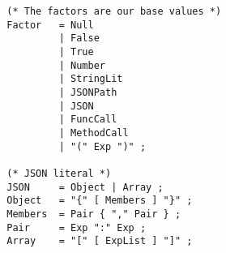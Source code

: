 \begin{center}
\begin{verbatim}
        (* The factors are our base values *)
        Factor   = Null
                 | False
                 | True
                 | Number
                 | StringLit
                 | JSONPath
                 | JSON
                 | FuncCall
                 | MethodCall
                 | "(" Exp ")" ;

        (* JSON literal *)
        JSON     = Object | Array ;
        Object   = "{" [ Members ] "}" ;
        Members  = Pair { "," Pair } ;
        Pair     = Exp ":" Exp ;
        Array    = "[" [ ExpList ] "]" ;
    \end{verbatim}
\end{center}
